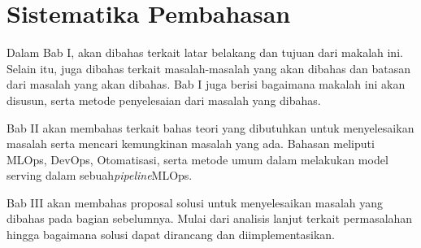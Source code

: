 \section{Sistematika Pembahasan}

Dalam Bab I, akan dibahas terkait latar belakang dan tujuan dari makalah ini.
Selain itu, juga dibahas terkait masalah-masalah yang akan dibahas dan batasan dari masalah yang akan dibahas.
Bab I juga berisi bagaimana makalah ini akan disusun, serta metode penyelesaian dari masalah yang dibahas.

Bab II akan membahas terkait bahas teori yang dibutuhkan untuk menyelesaikan masalah serta mencari kemungkinan masalah yang ada.
Bahasan meliputi MLOps, DevOps, Otomatisasi, serta metode umum dalam melakukan model serving dalam sebuah\textit{pipeline}MLOps.

Bab III akan membahas proposal solusi untuk menyelesaikan masalah yang dibahas pada bagian sebelumnya.
Mulai dari analisis lanjut terkait permasalahan hingga bagaimana solusi dapat dirancang dan diimplementasikan.